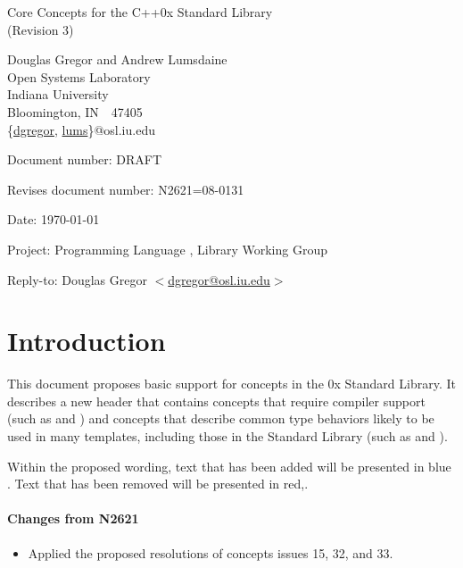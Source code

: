 \documentclass[american,twoside]{book}
\begin{document}
\raggedbottom

\begin{titlepage}
\begin{center}
\huge
Core Concepts for the C++0x Standard Library\\
(Revision 3)
\vspace{0.25in}

\normalsize
Douglas Gregor and Andrew Lumsdaine \\
Open Systems Laboratory \\
Indiana University \\
Bloomington, IN\ \  47405 \\
\{\href{mailto:dgregor@osl.iu.edu}{dgregor}, \href{mailto:lums@osl.iu.edu}{lums}\}@osl.iu.edu
\end{center}

\vspace{0.25in}
\par\noindent Document number: DRAFT\vspace{-6pt}
\par\noindent Revises document number: N2621=08-0131\vspace{-6pt}
\par\noindent Date: \today\vspace{-6pt}
\par\noindent Project: Programming Language \Cpp{}, Library Working Group\vspace{-6pt}
\par\noindent Reply-to: Douglas Gregor $<$\href{mailto:dgregor@osl.iu.edu}{dgregor@osl.iu.edu}$>$\vspace{-6pt}

\section*{Introduction}
This document proposes basic support for concepts in the \Cpp0x
Standard Library. It describes a new header  that
contains concepts that require compiler support (such as
 and ) and concepts that describe
common type behaviors likely to be used in many templates, including
those in the Standard Library (such as  and
). 

Within the proposed wording, text that has been added
\textcolor{addclr}{will be presented in blue} . Text that has been removed will be
presented \textcolor{remclr}{in red},.  


\paragraph*{Changes from N2621}
\begin{itemize}
\item Applied the proposed resolutions of concepts issues 15, 32, and 33.
\end{itemize}

\end{titlepage}
\end{document}
